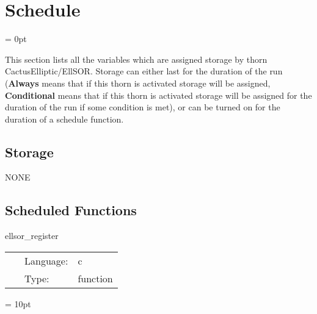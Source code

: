 
\section{Schedule} 


\parskip = 0pt


\noindent This section lists all the variables which are assigned storage by thorn CactusElliptic/EllSOR.  Storage can either last for the duration of the run ({\bf Always} means that if this thorn is activated storage will be assigned, {\bf Conditional} means that if this thorn is activated storage will be assigned for the duration of the run if some condition is met), or can be turned on for the duration of a schedule function.


\subsection*{Storage}NONE
\subsection*{Scheduled Functions}
\vspace{5mm}


\hspace{5mm} ellsor\_register 

\hspace{5mm}{\it register the sor solvers } 


\hspace{5mm}

 \begin{tabular*}{160mm}{cll} 
~ & Language:  & c \\ 
~ & Type:  & function \\ 
\end{tabular*} 



\vspace{5mm}\parskip = 10pt 
